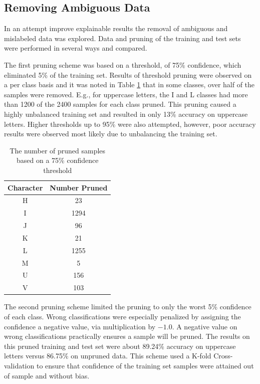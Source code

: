 \documentclass[conference]{IEEEtran}
\begin{document}
\subsection{Removing Ambiguous Data}

In an attempt improve explainable results the removal of ambiguous and
mislabeled data was explored. Data and pruning of the training and test sets
were performed in several ways and compared.

The first pruning scheme was based on a threshold, of 75\% confidence, which
eliminated 5\% of the training set. Results of threshold pruning were observed
on a per class basis and it was noted in Table \ref{tab_threshold_pruning_qty}
that in some classes, over half of the samples were removed.  E.g., for
uppercase letters, the I and L classes had more than 1200 of the 2400 samples
for each class pruned. This pruning caused a highly unbalanced training set and
resulted in only 13\% accuracy on uppercase letters.  Higher thresholds up to
95\% were also attempted, however, poor accuracy results were observed most
likely due to unbalancing the training set.

\begin{table}
    \centering
    \begin{tabular}{|c|c|}
        \hline
        Character & Number Pruned \\
        \hline
        \hline
        H & 23 \\
        I & 1294 \\
        J & 96 \\
        K & 21 \\
        L & 1255 \\
        M & 5 \\
        U & 156 \\
        V & 103 \\
        \hline
    \end{tabular}
    \caption{\label{tab_threshold_pruning_qty}The number of pruned samples based on a 75\% confidence threshold}
\end{table}

The second pruning scheme limited the pruning to only the worst 5\% confidence
of each class. Wrong classifications were especially penalized by assigning the
confidence a negative value, via multiplication by $-1.0$.  A negative value on
wrong classifications practically ensures a sample will be pruned. The results on
this pruned training and test set were about 89.24\% accuracy on uppercase letters
versus 86.75\% on unpruned data.  This scheme used a K-fold Cross-validation to
ensure that confidence of the training set samples were attained out of sample
and without bias.
\end{document}
